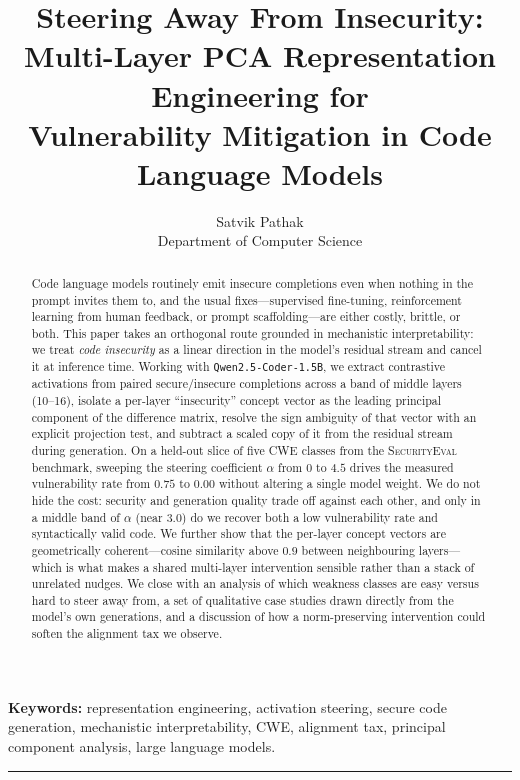 \documentclass[11pt,a4paper]{article}
\title{\vspace{-1.2cm}\sffamily\bfseries Steering Away From Insecurity:\\[2pt]
Multi-Layer PCA Representation Engineering for\\[2pt]
Vulnerability Mitigation in Code Language Models}
\author{
Satvik Pathak\\[2pt]
\normalsize Department of Computer Science
}
\date{}
\begin{document}
\maketitle
\thispagestyle{empty}

\begin{abstract}
\noindent
Code language models routinely emit insecure completions even when nothing in the prompt invites them to, and the usual fixes---supervised fine-tuning, reinforcement learning from human feedback, or prompt scaffolding---are either costly, brittle, or both. This paper takes an orthogonal route grounded in mechanistic interpretability: we treat \emph{code insecurity} as a linear direction in the model's residual stream and cancel it at inference time. Working with \texttt{Qwen2.5-Coder-1.5B}, we extract contrastive activations from paired secure/insecure completions across a band of middle layers (10--16), isolate a per-layer ``insecurity'' concept vector as the leading principal component of the difference matrix, resolve the sign ambiguity of that vector with an explicit projection test, and subtract a scaled copy of it from the residual stream during generation. On a held-out slice of five CWE classes from the \textsc{SecurityEval} benchmark, sweeping the steering coefficient $\alpha$ from $0$ to $4.5$ drives the measured vulnerability rate from $0.75$ to $0.00$ without altering a single model weight. We do not hide the cost: security and generation quality trade off against each other, and only in a middle band of $\alpha$ (near $3.0$) do we recover both a low vulnerability rate and syntactically valid code. We further show that the per-layer concept vectors are geometrically coherent---cosine similarity above $0.9$ between neighbouring layers---which is what makes a shared multi-layer intervention sensible rather than a stack of unrelated nudges. We close with an analysis of which weakness classes are easy versus hard to steer away from, a set of qualitative case studies drawn directly from the model's own generations, and a discussion of how a norm-preserving intervention could soften the alignment tax we observe.
\end{abstract}

\vspace{0.4cm}
\noindent\textbf{Keywords:} representation engineering, activation steering, secure code generation, mechanistic interpretability, CWE, alignment tax, principal component analysis, large language models.

\vspace{0.3cm}
\hrule
\vspace{0.5cm}
\end{document}
